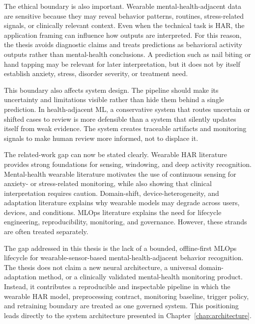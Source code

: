 The ethical boundary is also important. Wearable mental-health-adjacent data are sensitive because they may reveal behavior patterns, routines, stress-related signals, or clinically relevant context. Even when the technical task is HAR, the application framing can influence how outputs are interpreted. For this reason, the thesis avoids diagnostic claims and treats predictions as behavioral activity outputs rather than mental-health conclusions. A prediction such as nail biting or hand tapping may be relevant for later interpretation, but it does not by itself establish anxiety, stress, disorder severity, or treatment need.

This boundary also affects system design. The pipeline should make its uncertainty and limitations visible rather than hide them behind a single prediction. In health-adjacent ML, a conservative system that routes uncertain or shifted cases to review is more defensible than a system that silently updates itself from weak evidence. The system creates traceable artifacts and monitoring signals to make human review more informed, not to displace it.

The related-work gap can now be stated clearly. Wearable HAR literature provides strong foundations for sensing, windowing, and deep activity recognition. Mental-health wearable literature motivates the use of continuous sensing for anxiety- or stress-related monitoring, while also showing that clinical interpretation requires caution. Domain-shift, device-heterogeneity, and adaptation literature explains why wearable models may degrade across users, devices, and conditions. MLOps literature explains the need for lifecycle engineering, reproducibility, monitoring, and governance. However, these strands are often treated separately.

The gap addressed in this thesis is the lack of a bounded, offline-first MLOps lifecycle for wearable-sensor-based mental-health-adjacent behavior recognition. The thesis does not claim a new neural architecture, a universal domain-adaptation method, or a clinically validated mental-health monitoring product. Instead, it contributes a reproducible and inspectable pipeline in which the wearable HAR model, preprocessing contract, monitoring baseline, trigger policy, and retraining boundary are treated as one governed system. This positioning leads directly to the system architecture presented in Chapter~\ref{chap:architecture}.

